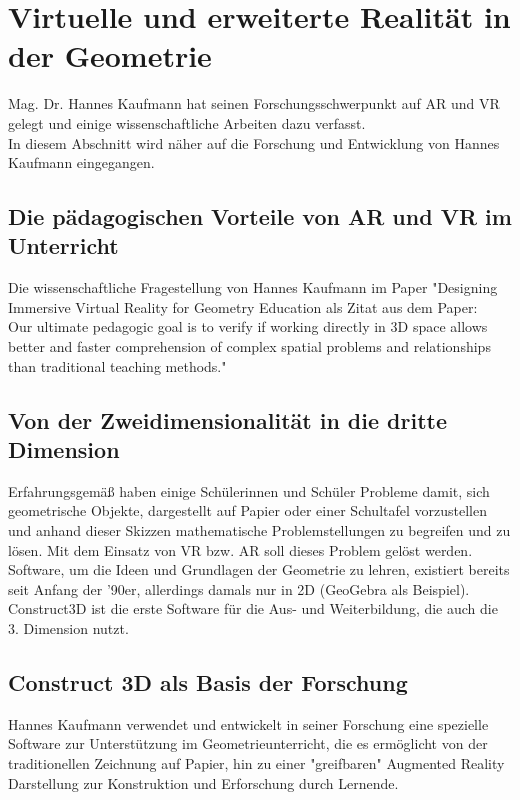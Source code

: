 \documentclass[deutsch]{llncs}
\begin{document}
\section{Virtuelle und erweiterte Realität in der Geometrie}
\label{sec:typo}
Mag. Dr. Hannes Kaufmann hat seinen Forschungsschwerpunkt auf AR und VR gelegt und einige wissenschaftliche Arbeiten dazu verfasst. \\
In diesem Abschnitt wird näher auf die Forschung und Entwicklung von Hannes Kaufmann eingegangen. 

\subsection{Die pädagogischen Vorteile von AR und VR im Unterricht}
\label{subsec:}
Die wissenschaftliche Fragestellung von Hannes Kaufmann im Paper "Designing Immersive Virtual Reality for Geometry Education als Zitat aus dem Paper: \\
Our ultimate pedagogic goal is to verify if working directly in 3D space allows better and faster comprehension of complex spatial problems and relationships than traditional teaching methods." %

\subsection{Von der Zweidimensionalität in die dritte Dimension}
\label{subsec:}
Erfahrungsgemäß haben einige Schülerinnen und Schüler Probleme damit, sich geometrische Objekte, dargestellt auf Papier oder einer Schultafel vorzustellen und anhand dieser Skizzen mathematische Problemstellungen zu begreifen und zu lösen. Mit dem Einsatz von VR bzw. AR soll dieses Problem gelöst werden.\\
Software, um die Ideen und Grundlagen der Geometrie zu lehren, existiert bereits seit Anfang der '90er, allerdings damals nur in 2D (GeoGebra als Beispiel). \\
Construct3D ist die erste Software für die Aus- und Weiterbildung, die auch die 3. Dimension nutzt. %


\subsection{Construct 3D als Basis der Forschung}
\label{subsec:}
Hannes Kaufmann verwendet und entwickelt in seiner Forschung eine spezielle Software zur Unterstützung im Geometrieunterricht, die es ermöglicht von der traditionellen Zeichnung auf Papier,
hin zu einer "greifbaren" Augmented Reality Darstellung zur Konstruktion und Erforschung durch Lernende. 
\end{document}
